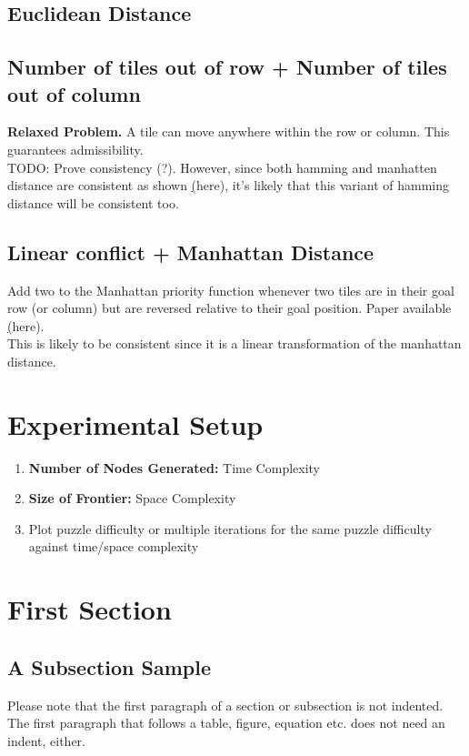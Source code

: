 \documentclass[runningheads]{llncs}
\begin{document}
\subsection{Euclidean Distance}

\subsection{Number of tiles out of row + Number of tiles out of column} 
\textbf{Relaxed Problem.} A tile can move anywhere within the row or column. This guarantees admissibility. \\
TODO: Prove consistency (?). However, since both hamming and manhatten distance are consistent as shown \href{https://www.cs.princeton.edu/courses/archive/fall12/cos226/checklist/8puzzle.html}(here), 
it's likely that this variant of hamming distance will be consistent too.

\subsection{Linear conflict + Manhattan Distance}
Add two to the Manhattan priority function whenever two tiles are in their goal row (or column) but are reversed relative to their goal position. Paper available \href{https://cse.sc.edu/~mgv/csce580sp15/gradPres/HanssonMayerYung1992.pdf}(here).\\
This is likely to be consistent since it is a linear transformation of the manhattan distance. \\ 

\section{Experimental Setup}
\begin{enumerate}
    \item \textbf{Number of Nodes Generated:} Time Complexity
    \item \textbf{Size of Frontier:} Space Complexity
    \item Plot puzzle difficulty or multiple iterations for the same puzzle difficulty against time/space complexity 
\end{enumerate}

\section{First Section}
\subsection{A Subsection Sample}
Please note that the first paragraph of a section or subsection is
not indented. The first paragraph that follows a table, figure,
equation etc. does not need an indent, either.
\end{document}
